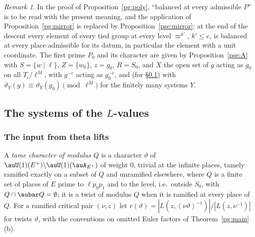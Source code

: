 \documentclass[10pt]{amsart}
\theoremstyle{definition}
\theoremstyle{remark}
\newtheorem{remark}[theorem]{Remark}
\begin{document}
\begin{remark}\label{pse:rem-poly}
In the proof of Proposition~\ref{pg:poly}, ``balanced at every admissible $P$'' is to be read with
the present meaning, and the application of Proposition~\ref{pg:mirror} is replaced by
Proposition~\ref{pse:mirror}: at the end of the descent every element of every tied group at every
level $\varpi^{k'}$, $k'\le e$, is balanced at every place admissible for its datum, in particular the
element with a unit coordinate. The first prime $P_0$ and its character are given by
Proposition~\ref{pse:A} with $S=\{w\mid\ell\}$, $Z=\{w_0\}$, $z=g_0$, $R=S_0$, and $X$ the open set
of $g$ acting as $g_0$ on all $T_i/\ell^M$, with $g^{-c}$ acting as $g_0^{-c}$, and (for
\S\ref{pse:ss-stick}) with $\vartheta_Y(g)\equiv\vartheta_Y(g_0)\pmod{\ell^M}$ for the finitely many
systems $Y$.
\end{remark}

\subsection{The systems of the \texorpdfstring{$L$}{L}-values}\label{pse:ss-stick}

\subsubsection*{The input from theta lifts}
A \emph{tame character of modulus $Q$} is a character $\vartheta$ of $\auU(1)(E^+)\backslash
\auU(1)(\auA_{E^+})$ of weight $0$, trivial at the infinite places, tamely ramified exactly on a
subset of $Q$ and unramified elsewhere, where $Q$ is a finite set of places of $E$ prime to $\ell p_0p_1$ and
to the level, i.e.\ outside $S_0$, with $Q\cap\aubar Q=\emptyset$; it is a twist of modulus $Q$ when it is ramified at every
place of $Q$. For a ramified critical pair $(\nu,z)$ let $r(\vartheta)=|L(z,(\nu\vartheta)^{-1})|/
|L(z,\nu^{-1})|$ for twists $\vartheta$, with the conventions on omitted Euler factors of
Theorem~\ref{pg:main}(b).
\end{document}
